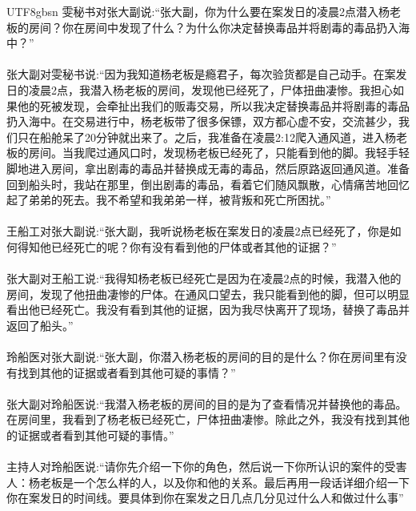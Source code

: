 \documentclass[11pt]{article}
\begin{document}
{\begin{CJK}{UTF8}{gbsn}
雯秘书对张大副说:``张大副，你为什么要在案发日的凌晨2点潜入杨老板的房间？你在房间中发现了什么？为什么你决定替换毒品并将剧毒的毒品扔入海中？''\\ \\
张大副对雯秘书说:``因为我知道杨老板是瘾君子，每次验货都是自己动手。在案发日的凌晨2点，我潜入杨老板的房间，发现他已经死了，尸体扭曲凄惨。我担心如果他的死被发现，会牵扯出我们的贩毒交易，所以我决定替换毒品并将剧毒的毒品扔入海中。在交易进行中，杨老板带了很多保镖，双方都心虚不安，交流甚少，我们只在船舱呆了20分钟就出来了。之后，我准备在凌晨2:12爬入通风道，进入杨老板的房间。当我爬过通风口时，发现杨老板已经死了，只能看到他的脚。我轻手轻脚地进入房间，拿出剧毒的毒品并替换成无毒的毒品，然后原路返回通风道。准备回到船头时，我站在那里，倒出剧毒的毒品，看着它们随风飘散，心情痛苦地回忆起了弟弟的死去。我不希望和我弟弟一样，被背叛和死亡所困扰。''\\ \\
王船工对张大副说:``张大副，我听说杨老板在案发日的凌晨2点已经死了，你是如何得知他已经死亡的呢？你有没有看到他的尸体或者其他的证据？''\\ \\
张大副对王船工说:``我得知杨老板已经死亡是因为在凌晨2点的时候，我潜入他的房间，发现了他扭曲凄惨的尸体。在通风口望去，我只能看到他的脚，但可以明显看出他已经死亡。我没有看到其他的证据，因为我尽快离开了现场，替换了毒品并返回了船头。''\\ \\
玲船医对张大副说:``张大副，你潜入杨老板的房间的目的是什么？你在房间里有没有找到其他的证据或者看到其他可疑的事情？''\\ \\
张大副对玲船医说:``我潜入杨老板的房间的目的是为了查看情况并替换他的毒品。在房间里，我看到了杨老板已经死亡，尸体扭曲凄惨。除此之外，我没有找到其他的证据或者看到其他可疑的事情。''\\ \\
主持人对玲船医说:``请你先介绍一下你的角色，然后说一下你所认识的案件的受害人：杨老板是一个怎么样的人，以及你和他的关系。最后再用一段话详细介绍一下你在案发日的时间线。要具体到你在案发之日几点几分见过什么人和做过什么事''\\ \\

\end{CJK}}
\end{document}
